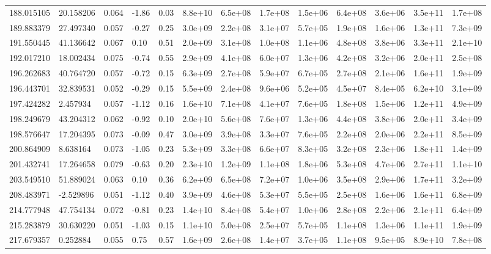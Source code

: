 \documentclass[referee]{aa}
\begin{document}
{\begin{landscape}
\begin{longtable}{lllllllllllll}
188.015105 & 20.158206 & 0.064 & -1.86 & 0.03 & 8.8e+10 & 6.5e+08 & 1.7e+08 & 1.5e+06 & 6.4e+08 & 3.6e+06 & 3.5e+11 & 1.7e+08 \\
189.883379 & 27.497340 & 0.057 & -0.27 & 0.25 & 3.0e+09 & 2.2e+08 & 3.1e+07 & 5.7e+05 & 1.9e+08 & 1.6e+06 & 1.3e+11 & 7.3e+09 \\
191.550445 & 41.136642 & 0.067 & 0.10 & 0.51 & 2.0e+09 & 3.1e+08 & 1.0e+08 & 1.1e+06 & 4.8e+08 & 3.8e+06 & 3.3e+11 & 2.1e+10 \\
192.017210 & 18.002434 & 0.075 & -0.74 & 0.55 & 2.9e+09 & 4.1e+08 & 6.0e+07 & 1.3e+06 & 4.2e+08 & 3.2e+06 & 2.0e+11 & 2.5e+08 \\
196.262683 & 40.764720 & 0.057 & -0.72 & 0.15 & 6.3e+09 & 2.7e+08 & 5.9e+07 & 6.7e+05 & 2.7e+08 & 2.1e+06 & 1.6e+11 & 1.9e+09 \\
196.443701 & 32.839531 & 0.052 & -0.29 & 0.15 & 5.5e+09 & 2.4e+08 & 9.6e+06 & 5.2e+05 & 4.5e+07 & 8.4e+05 & 6.2e+10 & 3.1e+09 \\
197.424282 & 2.457934 & 0.057 & -1.12 & 0.16 & 1.6e+10 & 7.1e+08 & 4.1e+07 & 7.6e+05 & 1.8e+08 & 1.5e+06 & 1.2e+11 & 4.9e+09 \\
198.249679 & 43.204312 & 0.062 & -0.92 & 0.10 & 2.0e+10 & 5.6e+08 & 7.6e+07 & 1.3e+06 & 4.4e+08 & 3.8e+06 & 2.0e+11 & 3.4e+09 \\
198.576647 & 17.204395 & 0.073 & -0.09 & 0.47 & 3.0e+09 & 3.9e+08 & 3.3e+07 & 7.6e+05 & 2.2e+08 & 2.0e+06 & 2.2e+11 & 8.5e+09 \\
200.864909 & 8.638164 & 0.073 & -1.05 & 0.23 & 5.3e+09 & 3.3e+08 & 6.6e+07 & 8.3e+05 & 3.2e+08 & 2.3e+06 & 1.8e+11 & 1.4e+09 \\
201.432741 & 17.264658 & 0.079 & -0.63 & 0.20 & 2.3e+10 & 1.2e+09 & 1.1e+08 & 1.8e+06 & 5.3e+08 & 4.7e+06 & 2.7e+11 & 1.1e+10 \\
203.549510 & 51.889024 & 0.063 & 0.10 & 0.36 & 6.2e+09 & 6.5e+08 & 7.2e+07 & 1.0e+06 & 3.5e+08 & 2.9e+06 & 1.7e+11 & 3.2e+09 \\
208.483971 & -2.529896 & 0.051 & -1.12 & 0.40 & 3.9e+09 & 4.6e+08 & 5.3e+07 & 5.5e+05 & 2.5e+08 & 1.6e+06 & 1.6e+11 & 6.8e+09 \\
214.777948 & 47.754134 & 0.072 & -0.81 & 0.23 & 1.4e+10 & 8.4e+08 & 5.4e+07 & 1.0e+06 & 2.8e+08 & 2.2e+06 & 2.1e+11 & 6.4e+09 \\
215.283879 & 30.630220 & 0.051 & -1.03 & 0.15 & 1.1e+10 & 5.0e+08 & 2.5e+07 & 5.7e+05 & 1.1e+08 & 1.3e+06 & 1.1e+11 & 1.9e+09 \\
217.679357 & 0.252884 & 0.055 & 0.75 & 0.57 & 1.6e+09 & 2.6e+08 & 1.4e+07 & 3.7e+05 & 1.1e+08 & 9.5e+05 & 8.9e+10 & 7.8e+08 \\

\end{longtable}
\end{landscape}}
\end{document}
